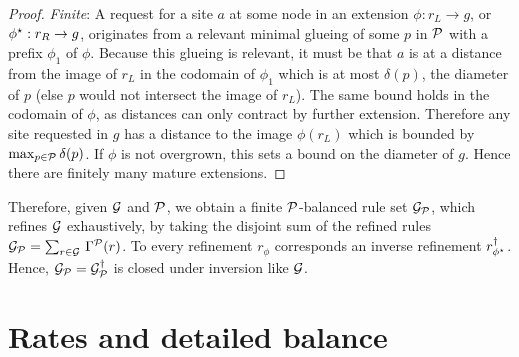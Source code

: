\begin{proof}
  \emph{Finite}:
  A request for a site $a$ at some node in an extension
  $\phi: r_L\to g$, or $\phi^\star: r_R \to g$,
  originates from a relevant minimal glueing
  of some $p$ in $\mathcal{P}$ with a prefix $\phi_1$ of $\phi$.
  Because this glueing is relevant,
  it must be that $a$ is at a distance from the image of $r_L$
  in the codomain of $\phi_1$ which is at most $\delta(p)$,
  the diameter of $p$ (else $p$ would not intersect the image of $r_L$).
  The same bound holds in the codomain of $\phi$,
  as distances can only contract by further extension.
  Therefore any site requested in $g$
  has a distance to the image $\phi(r_L)$
  which is bounded by $\max_{p \in \mathcal{P}}\delta(p)$.
  If $\phi$ is not overgrown,
  this sets a bound on the diameter of $g$.
  Hence there are finitely many mature extensions.
\end{proof}

Therefore, given $\mathcal{G}$ and $\mathcal{P}$,
we obtain a finite $\mathcal{P}$-balanced rule set $\mathcal{G}_{\mathcal{P}}$,
which refines $\mathcal{G}$ exhaustively,
by taking the disjoint sum of the refined rules
$\mathcal{G}_{\mathcal{P}} = \sum_{r \in \mathcal{G}} \,\Gamma^{\mathcal{P}}(r)$.
To every refinement $r_\phi$ corresponds
an inverse refinement $r^\dagger_{\phi^\star}$.
Hence, $\mathcal{G}_{\mathcal{P}} = \mathcal{G}_{\mathcal{P}}^\dagger$
is closed under inversion like $\mathcal{G}$.


\section{Rates and detailed balance}
\label{sec:rates}

